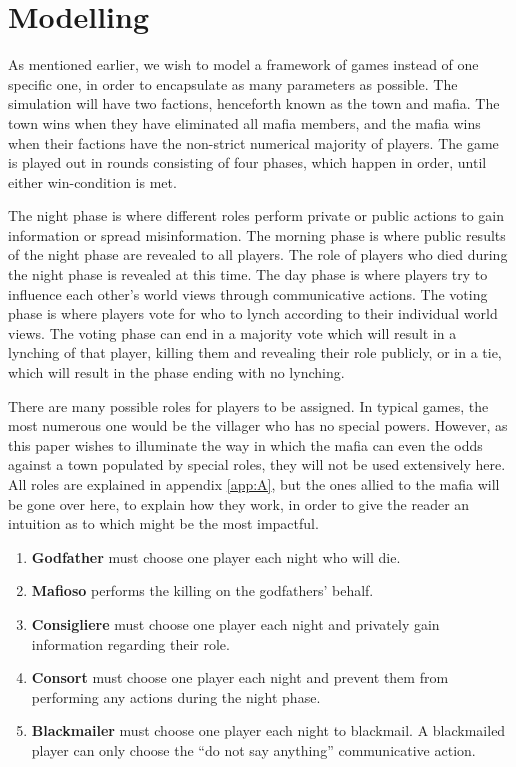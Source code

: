 \section{Modelling}
As mentioned earlier, we wish to model a framework of games instead of one
specific one, in order to encapsulate as many parameters as possible. The
simulation will have two factions, henceforth known as the town and mafia. The
town wins when they have eliminated all mafia members, and the mafia wins when
their factions have the non-strict numerical majority of players. The game is
played out in rounds consisting of four phases, which happen in order, until
either win-condition is met.

The night phase is where different roles perform private or public actions to
gain information or spread misinformation. The morning phase is where public
results of the night phase are revealed to all players. The role of players who
died during the night phase is revealed at this time. The day phase is where
players try to influence each other's world views through communicative
actions. The voting phase is where players vote for who to lynch according to
their individual world views. The voting phase can end in a majority vote which
will result in a lynching of that player, killing them and revealing their role
publicly, or in a tie, which will result in the phase ending with no lynching.

There are many possible roles for players to be assigned. In typical games, the
most numerous one would be the villager who has no special powers. However, as
this paper wishes to illuminate the way in which the mafia can even the odds
against a town populated by special roles, they will not be used extensively
here. All roles are explained in appendix \ref{app:A}, but the ones allied to
the mafia will be gone over here, to explain how they work, in order to give
the reader an intuition as to which might be the most impactful.

\begin{enumerate}
	\itemsep0px
	\item\textbf{Godfather} must choose one player each night who will die.
	\item\textbf{Mafioso} performs the killing on the godfathers' behalf.
	\item\textbf{Consigliere} must choose one player each night and privately
	      gain information regarding their role.
	\item\textbf{Consort} must choose one player each night and prevent them
	      from performing any actions during the night phase.
	\item\textbf{Blackmailer} must choose one player each night to blackmail. A
	      blackmailed player can only choose the “do not say anything” communicative
	      action.
\end{enumerate}

